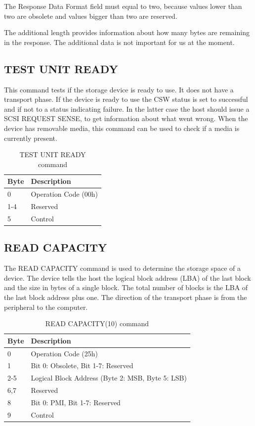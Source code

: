 The Response Data Format field must equal to two, because values lower than two are obsolete and values bigger than two are reserved\cite{scsi_seagate}.

The additional length provides information about how many bytes are remaining in the response. The additional data is not important for us at the moment.

\subsection{TEST UNIT READY}

This command tests if the storage device is ready to use. It does not have a transport phase. If the device is ready to use the CSW status is set to successful and if not to a status indicating failure. In the latter case the host should issue a SCSI REQUEST SENSE, to get information about what went wrong. When the device has removable media, this command can be used to check if a media is currently present\cite{usb_ms_jan}.

\begin{table}[ht]
\caption{TEST UNIT READY command \cite{scsi_seagate}}
\centering
\begin{tabular}{|l|l|}
\hline\hline
\textbf{Byte} & \textbf{Description}\\ \hline
0 & Operation Code (00h)\\ \hline
1-4 & Reserved \\ \hline
5 & Control \\ \hline
\end{tabular}
\label{table:unit_ready}
\end{table}

\newpage

\subsection{READ CAPACITY}

The READ CAPACITY command is used to determine the storage space of a device. The device tells the host the logical block address (LBA) of the last block and the size in bytes of a single block. The total number of blocks is the LBA of the last block address plus one. The direction of the transport phase is from the peripheral to the computer.

\begin{table}[ht]
\caption{READ CAPACITY(10) command \cite{scsi_seagate}}
\centering
\begin{tabular}{|l|l|}
\hline\hline
\textbf{Byte} & \textbf{Description}\\ \hline
0 & Operation Code (25h)\\ \hline
1 & Bit 0: Obsolete, Bit 1-7: Reserved \\ \hline
2-5 & Logical Block Address (Byte 2: MSB, Byte 5: LSB) \\ \hline
6,7 & Reserved \\ \hline
8 & Bit 0: PMI, Bit 1-7: Reserved \\ \hline
9 & Control \\ \hline
\end{tabular}
\label{table:read_capacity}
\end{table}

